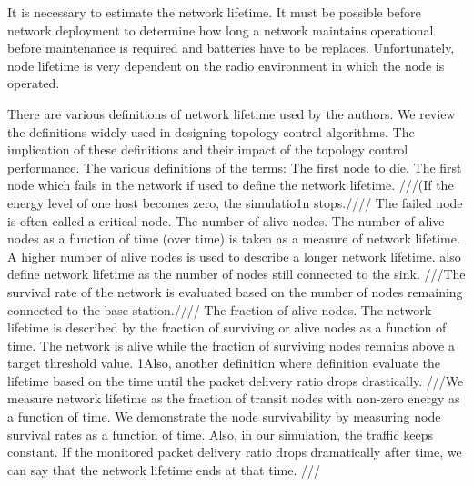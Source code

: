 It is necessary to estimate the network lifetime. It must be possible before network deployment to determine how long a network maintains operational before maintenance is required and batteries have to be replaces. Unfortunately, node lifetime is very dependent on the radio environment in which the node is operated. \cite{alexlifetime}

There are various definitions of network lifetime used by the authors. We review the definitions widely used in designing topology control algorithms. The implication of these definitions and their impact of the topology control performance. The various definitions of the terms:
The first node to die. The first node which fails in the network if used to define the network lifetime. ///(If the energy level of one host becomes zero, the simulatio1n stops.//// \cite{lifetimedef1} The failed node is often called a critical node.
The number of alive nodes. The number of alive nodes as a function of time (over time) \cite{lifetimedef2, smecn} is taken as a measure of network lifetime. A higher number of alive nodes is used to describe a longer network lifetime. \cite{smecn} also define network lifetime as the number of nodes still connected to the sink. ///The survival rate of the network is evaluated based on the number of nodes remaining connected to the base station.////
The fraction of alive nodes. The network lifetime is described by the fraction of surviving or alive nodes as a function of time. The network is alive while the fraction of surviving nodes remains above a target threshold value. 1Also, another definition where definition evaluate the lifetime based on the time until the packet delivery ratio drops drastically. ///We measure network lifetime as the fraction of transit nodes with non-zero energy as a function of time. We demonstrate the node survivability by measuring node survival rates as a function of time. Also, in our simulation, the traffic keeps constant. If the monitored packet delivery ratio drops dramatically after time, we can say that the network lifetime ends at that time. \cite{gaf}///


